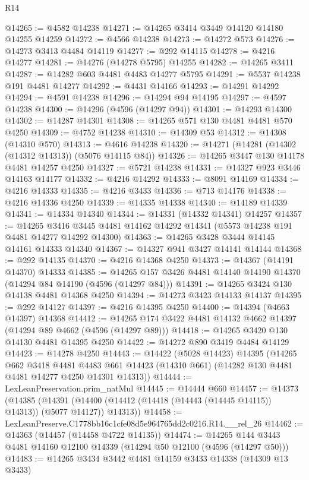 \begin{lexlean}{R14}
\begin{coremodule}
@14265 := @4582 @14238
@14271 := @14265 @3414 @3449 @14120 @14180 @14255 @14259
@14272 := @4566 @14238
@14273 := @14272 @573
@14276 := @14273 @3413 @4484 @14119
@14277 := @292 @14115
@14278 := @4216 @14277
@14281 := @14276 (@14278 @5795) @14255
@14282 := @14265 @3411
@14287 := @14282 @603 @4481 @4483 @14277 @5795
@14291 := @5537 @14238 @191 @4481 @14277
@14292 := @4431 @14166
@14293 := @14291 @14292
@14294 := @4591 @14238
@14296 := @14294 @94 @14195
@14297 := @4597 @14238
@14300 := @14296 (@4596 (@14297 @94))
@14301 := @14293 @14300
@14302 := @14287 @14301
@14308 := @14265 @571 @130 @4481 @4481 @570 @4250
@14309 := @4752 @14238
@14310 := @14309 @53
@14312 := @14308 (@14310 @570)
@14313 := @4616 @14238
@14320 := @14271 (@14281 (@14302 (@14312 @14313)) (@5076 @14115 @84))
@14326 := @14265 @3447 @130 @14178 @4481 @14257 @4250
@14327 := @5721 @14238
@14331 := @14327 @923 @3446 @14163 @14177
@14332 := @4216 @14292
@14333 := @8091 @14169
@14334 := @4216 @14333
@14335 := @4216 @3433
@14336 := @713 @14176
@14338 := @4216 @14336 @4250
@14339 := @14335 @14338
@14340 := @14189 @14339
@14341 := @14334 @14340
@14344 := @14331 (@14332 @14341) @14257
@14357 := @14265
    @3416
    @3445
    @4481
    @14162
    @14292
    @14341
    (@5573 @14238 @191 @4481 @14277 @14292 @14300)
@14363 := @14265 @3428 @3444 @14145 @14161 @14333 @14340
@14367 := @14327 @941 @3427 @14141 @14144
@14368 := @292 @14135
@14370 := @4216 @14368 @4250
@14373 := @14367 (@14191 @14370) @14333
@14385 := @14265 @157 @3426 @4481 @14140 @14190 @14370 (@14294 @84 @14190 (@4596 (@14297 @84)))
@14391 := @14265 @3424 @130 @14138 @4481 @14368 @4250
@14394 := @14273 @3423 @14133 @14137
@14395 := @292 @14127
@14397 := @4216 @14395 @4250
@14400 := @14394 (@4663 @14397) @14368
@14412 := @14265 @174 @3422 @4481 @14132 @4662 @14397 (@14294 @89 @4662 (@4596 (@14297 @89)))
@14418 := @14265 @3420 @130 @14130 @4481 @14395 @4250
@14422 := @14272 @890 @3419 @4484 @14129
@14423 := @14278 @4250
@14443 := @14422
    (@5028 @14423)
    @14395
    (@14265
      @662
      @3418
      @4481
      @4483
      @661
      @14423
      (@14310 @661)
      (@14282 @130 @4481 @4481 @14277 @4250 @14301 @14313))
@14444 := LexLeanPreservation.prim_natMul
@14445 := @14444 @660
@14457 := @14373
    (@14385
      (@14391 (@14400 (@14412 (@14418 (@14443 (@14445 @14115)) @14313)) (@5077 @14127)) @14313))
@14458 := LexLeanPreserve.C1778bb16c1cfe08d5e964765dd2c0216.R14.__rel_26
@14462 := @14363 (@14457 (@14458 @4722 @14135))
@14474 := @14265 @144 @3443 @4481 @14160 @12100 @14339 (@14294 @50 @12100 (@4596 (@14297 @50)))
@14483 := @14265 @3434 @3442 @4481 @14159 @3433 @14338 (@14309 @13 @3433)

\end{coremodule}
\end{lexlean}
